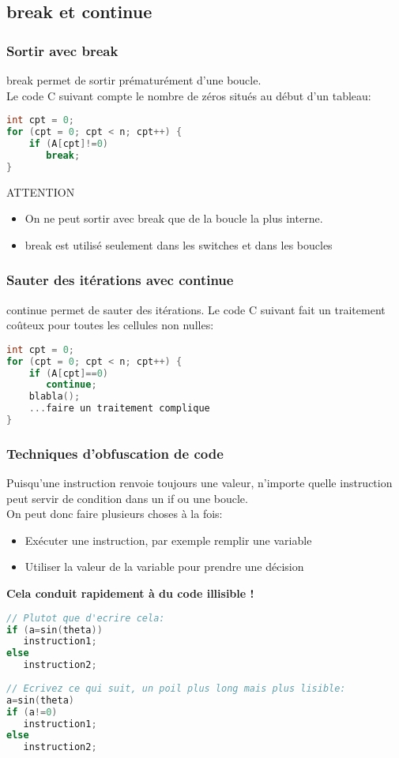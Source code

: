 \documentclass{beamer}
\begin{document}
\subsection{break et continue}

\begin{frame}[fragile=singleslide,shrink=20]
\frametitle {Sortir avec break}
break permet de sortir prématurément d'une boucle. \\
Le code C suivant compte le nombre de zéros situés au début d'un tableau:
\begin{lstlisting}[language=c++]
int cpt = 0;
for (cpt = 0; cpt < n; cpt++) {
    if (A[cpt]!=0)
       break;
}
\end{lstlisting}

\begin{block}{ATTENTION}
\begin{itemize}
\item{On ne peut sortir avec break que de la boucle la plus interne.}
\item{break est utilisé seulement dans les switches et dans les boucles}
\end{itemize}
\end{block}
\end{frame}

\begin{frame}[fragile=singleslide,shrink=20]
\frametitle {Sauter des itérations avec continue}
continue permet de sauter des itérations.
Le code C suivant fait un traitement coûteux pour toutes les cellules non nulles:
\begin{lstlisting}[language=c++]
int cpt = 0;
for (cpt = 0; cpt < n; cpt++) {
    if (A[cpt]==0)
       continue;
    blabla();
    ...faire un traitement complique
}
\end{lstlisting}
\end{frame}

\begin{frame}[fragile=singleslide,shrink=20]
\frametitle {Techniques d'obfuscation de code}
Puisqu'une instruction renvoie toujours une valeur, n'importe quelle instruction \\
peut servir de condition dans un if ou une boucle.\\
On peut donc faire plusieurs choses à la fois:

\begin{itemize}
\item{Exécuter une instruction, par exemple remplir une variable}
\item{Utiliser la valeur de la variable pour prendre une décision}
\end{itemize}

\textbf{Cela conduit rapidement à du code illisible !}

\begin{lstlisting}[language=c++]
// Plutot que d'ecrire cela:
if (a=sin(theta))
   instruction1;
else
   instruction2;
   
// Ecrivez ce qui suit, un poil plus long mais plus lisible:
a=sin(theta)
if (a!=0)
   instruction1;
else
   instruction2;
\end{lstlisting}
\end{frame}
\end{document}
